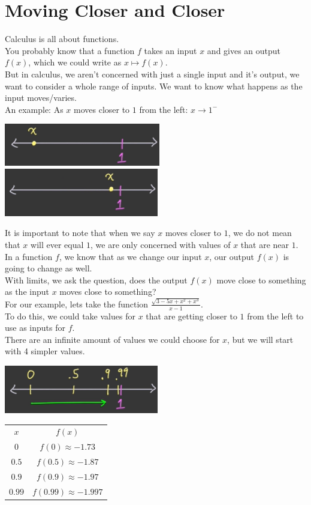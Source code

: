 \documentclass{article}
\begin{document}
\section{Moving Closer and Closer}
Calculus is all about functions.
\\You probably know that a function $f$ takes an input $x$ and gives an output $f(x)$, which we could write as
$x \mapsto f(x)$.
\\But in calculus, we aren't concerned with just a single input and it's output, we want to consider
a whole range of inputs. We want to know what happens as the input moves/varies.
\\An example: As $x$ moves closer to $1$ from the left: $x \rightarrow 1^{-}$
\begin{center}
    \includegraphics[scale = 1]{Images/MovingCloser1.png}
    \\\includegraphics[scale = 1.01]{Images/MovingCloser2.png}        
\end{center}
It is important to note that when we say $x$ moves closer to $1$, we do not mean that $x$ will ever
equal $1$, we are only concerned with values of $x$ that are near $1$.
\\In a function $f$, we know that as we change our input $x$, our output $f(x)$ is going to change as well.
\\With limits, we ask the question, does the output $f(x)$ move close to something as the input $x$
moves close to something?
\\For our example, lets take the function $\frac{\sqrt{3 - 5x + x^{2} + x^{3}}}{x - 1}$.
\\To do this, we could take values for $x$ that are getting closer to $1$ from the left to use as
inputs for $f$.
\\There are an infinite amount of values we could choose for $x$, but we will start with 4 simpler values.
\begin{center}
    \includegraphics[scale = 1]{Images/MovingCloser3.png}\\
    \begin{tabular} { c|c }
        $x$ & $f(x)$\\
        \cline{1-2} 
        $0$ & $f(0) \approx -1.73$\\
        $0.5$ & $f(0.5) \approx -1.87$\\
        $0.9$ & $f(0.9) \approx -1.97$\\
        $0.99$ & $f(0.99) \approx -1.997$
    \end{tabular}
\end{center}
\end{document}
